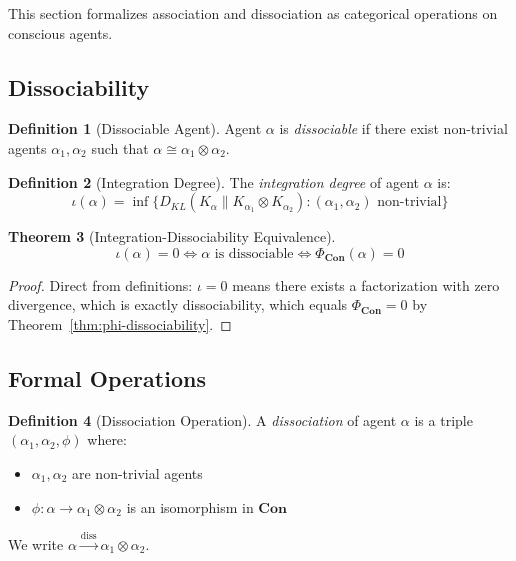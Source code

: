 \documentclass[11pt,a4paper]{article}
\theoremstyle{definition}
\newtheorem{definition}{Definition}[section]
\theoremstyle{plain}
\newtheorem{theorem}[definition]{Theorem}
\theoremstyle{remark}
\newcommand{\Con}{\mathbf{Con}}
\begin{document}
This section formalizes association and dissociation as categorical operations on conscious agents.

\subsection{Dissociability}

\begin{definition}[Dissociable Agent]\label{def:dissociable}
Agent $\alpha$ is \emph{dissociable} if there exist non-trivial agents $\alpha_1, \alpha_2$ such that $\alpha \cong \alpha_1 \otimes \alpha_2$.
\end{definition}

\begin{definition}[Integration Degree]\label{def:integration-degree}
The \emph{integration degree} of agent $\alpha$ is:
\[
\iota(\alpha) = \inf \{ D_{KL}(K_\alpha \| K_{\alpha_1} \otimes K_{\alpha_2}) : (\alpha_1, \alpha_2) \text{ non-trivial} \}
\]
\end{definition}

\begin{theorem}[Integration-Dissociability Equivalence]\label{thm:integration-dissociability}
\[
\iota(\alpha) = 0 \iff \alpha \text{ is dissociable} \iff \Phi_{\Con}(\alpha) = 0
\]
\end{theorem}

\begin{proof}
Direct from definitions: $\iota = 0$ means there exists a factorization with zero divergence, which is exactly dissociability, which equals $\Phi_{\Con} = 0$ by Theorem~\ref{thm:phi-dissociability}.
\end{proof}

\subsection{Formal Operations}

\begin{definition}[Dissociation Operation]\label{def:dissociation-op}
A \emph{dissociation} of agent $\alpha$ is a triple $(\alpha_1, \alpha_2, \phi)$ where:
\begin{itemize}
    \item $\alpha_1, \alpha_2$ are non-trivial agents
    \item $\phi: \alpha \to \alpha_1 \otimes \alpha_2$ is an isomorphism in $\Con$
\end{itemize}
We write $\alpha \xrightarrow{\text{diss}} \alpha_1 \otimes \alpha_2$.
\end{definition}
\end{document}
